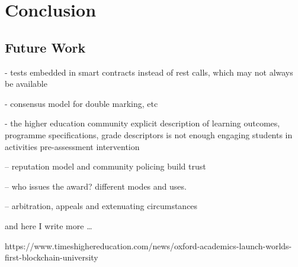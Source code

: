 \chapter{Conclusion}

\section{Future Work}

- tests embedded in smart contracts instead of rest calls, which may not always be available

- consensus model for double marking, etc

- the higher education community explicit description of learning outcomes, programme specifications, grade descriptors is not enough
engaging students in activities pre-assessment intervention \citep{bryan2006innovative}

-- reputation model and community policing build trust

-- who issues the award? different modes and uses. 

-- arbitration, appeals and extenuating circumstances

and here I write more \dots

https://www.timeshighereducation.com/news/oxford-academics-launch-worlds-first-blockchain-university